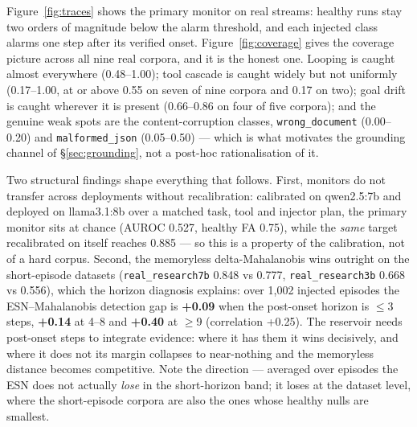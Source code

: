 \documentclass{article}
\begin{document}
Figure~\ref{fig:traces} shows the primary monitor on real streams: healthy runs stay two orders of magnitude below the alarm threshold, and each injected class alarms one step after its verified onset. Figure~\ref{fig:coverage} gives the coverage picture across all nine real corpora, and it is the honest one. Looping is caught almost everywhere (0.48--1.00); tool cascade is caught widely but not uniformly (0.17--1.00, at or above 0.55 on seven of nine corpora and 0.17 on two); goal drift is caught wherever it is present (0.66--0.86 on four of five corpora); and the genuine weak spots are the content-corruption classes, \texttt{wrong\_document} (0.00--0.20) and \texttt{malformed\_json} (0.05--0.50) --- which is what motivates the grounding channel of \S\ref{sec:grounding}, not a post-hoc rationalisation of it.

Two structural findings shape everything that follows. First, monitors do not transfer across deployments without recalibration: calibrated on qwen2.5:7b and deployed on llama3.1:8b over a matched task, tool and injector plan, the primary monitor sits at chance (AUROC 0.527, healthy FA 0.75), while the \emph{same} target recalibrated on itself reaches 0.885 --- so this is a property of the calibration, not of a hard corpus. Second, the memoryless delta-Mahalanobis wins outright on the short-episode datasets (\texttt{real\_research7b} 0.848 vs 0.777, \texttt{real\_research3b} 0.668 vs 0.556), which the horizon diagnosis explains: over 1,002 injected episodes the ESN--Mahalanobis detection gap is \textbf{+0.09} when the post-onset horizon is $\le$3 steps, \textbf{+0.14} at 4--8 and \textbf{+0.40} at $\ge$9 (correlation +0.25). The reservoir needs post-onset steps to integrate evidence: where it has them it wins decisively, and where it does not its margin collapses to near-nothing and the memoryless distance becomes competitive. Note the direction --- averaged over episodes the ESN does not actually \emph{lose} in the short-horizon band; it loses at the dataset level, where the short-episode corpora are also the ones whose healthy nulls are smallest.
\end{document}
